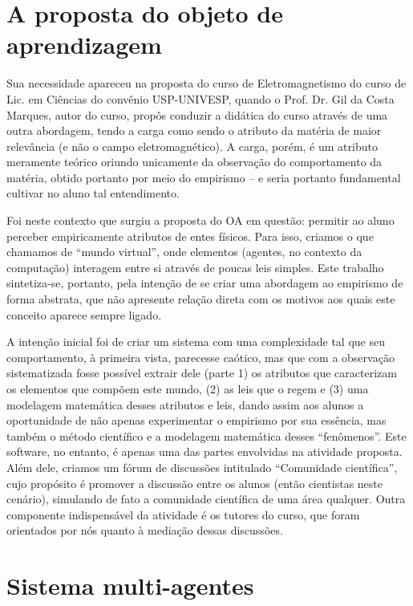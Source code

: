 \documentclass[a0,portrait]{a0poster}
\begin{document}
\section{A proposta do objeto de aprendizagem}

Sua necessidade apareceu na proposta do curso de Eletromagnetismo do curso de Lic.
em Ciências do convênio USP-UNIVESP, quando o Prof. Dr. Gil da Costa Marques,
autor do curso, propôs conduzir a didática do curso através de uma outra abordagem,
tendo a carga como sendo o atributo da matéria de maior relevância (e não o campo
eletromagnético). A carga, porém, é um atributo meramente teórico oriundo unicamente
da observação do comportamento da matéria, obtido portanto por meio do empirismo –
e seria portanto fundamental cultivar no aluno tal entendimento.

Foi neste contexto que surgiu a proposta do OA em questão: permitir ao aluno
perceber empiricamente atributos de entes físicos. Para isso, criamos o que chamamos
de “mundo virtual”, onde elementos (agentes, no contexto da computação) interagem
entre si através de poucas leis simples. Este trabalho sintetiza-se, portanto, pela intenção
de se criar uma abordagem ao empirismo de forma abstrata, que não apresente relação
direta com os motivos aos quais este conceito aparece sempre ligado.

A intenção inicial foi de criar um sistema com uma complexidade tal que seu
comportamento, à primeira vista, parecesse caótico, mas que com a observação
sistematizada fosse possível extrair dele (parte 1) os atributos que caracterizam os
elementos que compõem este mundo, (2) as leis que o regem e (3) uma modelagem
matemática desses atributos e leis, dando assim aos alunos a oportunidade de não
apenas experimentar o empirismo por sua essência, mas também o método científico e a
modelagem matemática desses “fenômenos”. Este software, no entanto, é apenas uma
das partes envolvidas na atividade proposta. Além dele, criamos um fórum de
discussões intitulado “Comunidade científica”, cujo propósito é promover a discussão
entre os alunos (então cientistas neste cenário), simulando de fato a comunidade
científica de uma área qualquer. Outra componente indispensável da atividade é os
tutores do curso, que foram orientados por nós quanto à mediação dessas discussões.

\section{Sistema multi-agentes}
\end{document}
